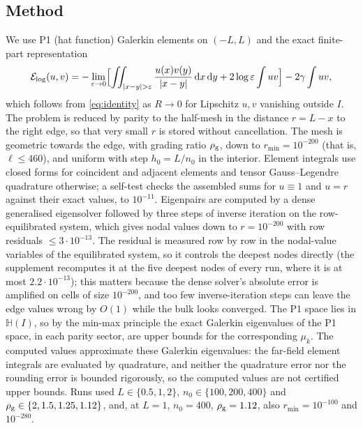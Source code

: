 \documentclass[11pt]{amsart}
\newcommand{\E}{\mathcal{E}}
\newcommand{\Hs}{\mathbb{H}}
\newcommand{\eps}{\varepsilon}
\newcommand{\dd}{\,\mathrm{d}}
\newcommand{\e}[1]{\cdot 10^{#1}}
\theoremstyle{definition}
\theoremstyle{remark}
\numberwithin{equation}{section}
\begin{document}
\subsection*{Method}
We use P1 (hat function) Galerkin elements on $(-L,L)$ and the exact finite-part representation
\[
\E_{\log}(u,v)=-\lim_{\eps\to0}\Bigl[\iint_{|x-y|>\eps}\frac{u(x)v(y)}{|x-y|}\dd x\dd y+2\log\eps\int uv\Bigr]-2\gamma\int uv,
\]
which follows from \eqref{eq:identity} as $R\to0$ for Lipschitz $u,v$ vanishing outside $I$. The problem is reduced by parity to the half-mesh in the distance $r=L-x$ to the right edge, so that very small $r$ is stored without cancellation. The mesh is geometric towards the edge, with grading ratio $\rho_{\rm g}$, down to $r_{\min}=10^{-200}$ (that is, $\ell\le460$), and uniform with step $h_0=L/n_0$ in the interior. Element integrals use closed forms for coincident and adjacent elements and tensor Gauss--Legendre quadrature otherwise; a self-test checks the assembled sums for $u\equiv1$ and $u=r$ against their exact values, to $10^{-11}$. Eigenpairs are computed by a dense generalised eigensolver followed by three steps of inverse iteration on the row-equilibrated system, which gives nodal values down to $r=10^{-200}$ with row residuals $\le3\e{-13}$. The residual is measured row by row in the nodal-value variables of the equilibrated system, so it controls the deepest nodes directly (the supplement recomputes it at the five deepest nodes of every run, where it is at most $2.2\e{-13}$); this matters because the dense solver's absolute error is amplified on cells of size $10^{-200}$, and too few inverse-iteration steps can leave the edge values wrong by $O(1)$ while the bulk looks converged. The P1 space lies in $\Hs(I)$, so by the min-max principle the exact Galerkin eigenvalues of the P1 space, in each parity sector, are upper bounds for the corresponding $\mu_k$. The computed values approximate these Galerkin eigenvalues: the far-field element integrals are evaluated by quadrature, and neither the quadrature error nor the rounding error is bounded rigorously, so the computed values are not certified upper bounds. Runs used $L\in\{0.5,1,2\}$, $n_0\in\{100,200,400\}$ and $\rho_{\rm g}\in\{2,1.5,1.25,1.12\}$, and, at $L=1$, $n_0=400$, $\rho_{\rm g}=1.12$, also $r_{\min}=10^{-100}$ and $10^{-280}$.
\end{document}

